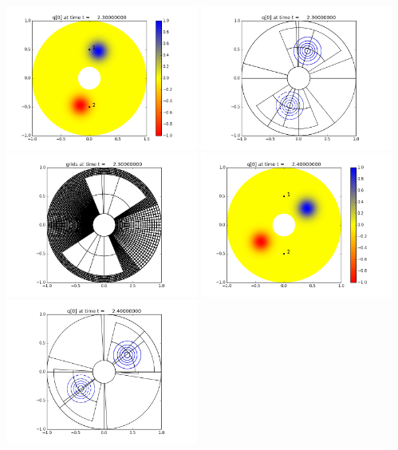 \documentclass[11pt]{article}
\begin{document}
\vskip 10pt 
\includegraphics[width=0.475\textwidth]{frame0023fig0.png}
\includegraphics[width=0.475\textwidth]{frame0023fig1.png}
\vskip 10pt 
\includegraphics[width=0.475\textwidth]{frame0023fig2.png}
\vskip 10pt 
\includegraphics[width=0.475\textwidth]{frame0024fig0.png}
\includegraphics[width=0.475\textwidth]{frame0024fig1.png}
\end{document}
